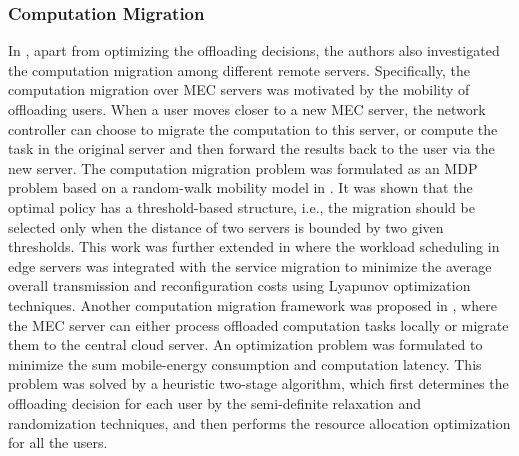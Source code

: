 \documentclass[journal]{IEEEtran}
\begin{document}
\subsubsection{\textbf{Computation Migration}} In \cite{wang2014mobility,urgaonkar2015dynamic,chen2016joint}, apart from optimizing the offloading decisions, the authors also investigated the computation migration among different remote servers. Specifically, the computation migration over MEC servers was motivated by the mobility of offloading users. When a user moves closer to a new MEC server, the network controller can choose to migrate the computation to this server, or compute the task in the original server and then forward the results back to the user via the new server. The computation migration problem was formulated as an MDP problem based on a random-walk mobility model in \cite{wang2014mobility}. It was shown that the optimal policy has a threshold-based structure, i.e., the migration should be selected only when the distance of two servers is bounded by two given thresholds. This work was further extended in \cite{urgaonkar2015dynamic} where the workload scheduling in edge servers was integrated with the service migration to minimize the average overall transmission and reconfiguration costs using Lyapunov optimization techniques. Another computation migration framework was proposed in \cite{chen2016joint}, where the MEC server can either process offloaded computation tasks locally or migrate them to the central cloud server. An optimization problem was formulated to minimize the sum mobile-energy consumption and computation latency. This problem was solved by a heuristic two-stage algorithm, which first determines the offloading decision for each user by the semi-definite relaxation and randomization techniques, and then performs the resource allocation optimization for all the users.
\end{document}
